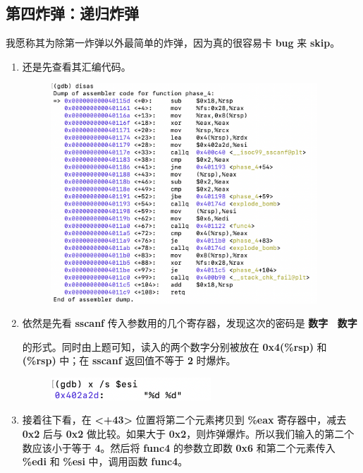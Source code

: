     \subsection{第四炸弹：递归炸弹}
        \par 我愿称其为除第一炸弹以外最简单的炸弹，因为真的很容易卡 \textbf{bug} 来 \textbf{skip}。
        \begin{enumerate}
            \item 还是先查看其汇编代码。
                \begin{figure}[htbp]
                    \hspace*{2cm}
                    \includegraphics*[width = 10cm]{s4_0.png}
                \end{figure}
            \item 依然是先看 \textbf{sscanf} 传入参数用的几个寄存器，发现这次的密码是 \textbf{数字 \ 数字} \par 的形式。同时由上题可知，读入的两个数字分别被放在 \textbf{0x4(\%rsp)} 和 \textbf{(\%rsp)} 中；在 \textbf{sscanf} 返回值不等于 \textbf{2} 时爆炸。
                \begin{figure}[htbp]
                    \hspace*{2cm}
                    \includegraphics*[width = 6cm]{s4_1.png}
                \end{figure}
            \item 接着往下看，在 \textbf{<+43>} 位置将第二个元素拷贝到 \textbf{\%eax} 寄存器中，减去 \textbf{0x2} 后与 \textbf{0x2} 做比较。如果大于 \textbf{0x2}，则炸弹爆炸。所以我们输入的第二个数应该小于等于 \textbf{4}。然后将 \textbf{func4} 的参数立即数 \textbf{0x6} 和第二个元素传入 \textbf{\%edi}  和 \textbf{\%esi} 中，调用函数 \textbf{func4}。

\end{enumerate}
